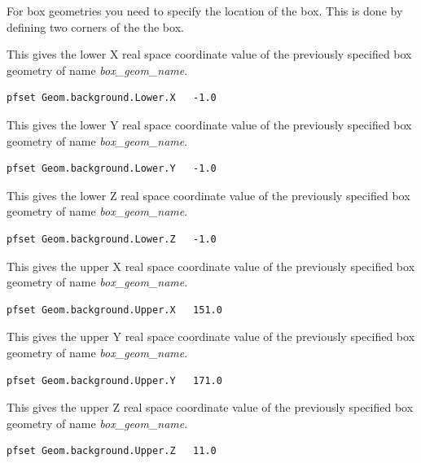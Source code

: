 For box geometries you need to specify the location of the box.  This
is done by defining two corners of the the box.

{This gives the lower X real space coordinate value
of the previously specified box geometry of name {\em box\_geom\_name}.}
\begin{display}\begin{verbatim}
pfset Geom.background.Lower.X   -1.0
\end{verbatim}\end{display}

{This gives the lower Y real space coordinate value
of the previously specified box geometry of name {\em box\_geom\_name}.}
\begin{display}\begin{verbatim}
pfset Geom.background.Lower.Y   -1.0
\end{verbatim}\end{display}

{This gives the lower Z real space coordinate value
of the previously specified box geometry of name {\em box\_geom\_name}.}
\begin{display}\begin{verbatim}
pfset Geom.background.Lower.Z   -1.0
\end{verbatim}\end{display}

{This gives the upper X real space coordinate value
of the previously specified box geometry of name {\em box\_geom\_name}.}
\begin{display}\begin{verbatim}
pfset Geom.background.Upper.X   151.0
\end{verbatim}\end{display}

{This gives the upper Y real space coordinate value
of the previously specified box geometry of name {\em box\_geom\_name}.}
\begin{display}\begin{verbatim}
pfset Geom.background.Upper.Y   171.0
\end{verbatim}\end{display}

{This gives the upper Z real space coordinate value
of the previously specified box geometry of name {\em box\_geom\_name}.}
\begin{display}\begin{verbatim}
pfset Geom.background.Upper.Z   11.0
\end{verbatim}\end{display}

